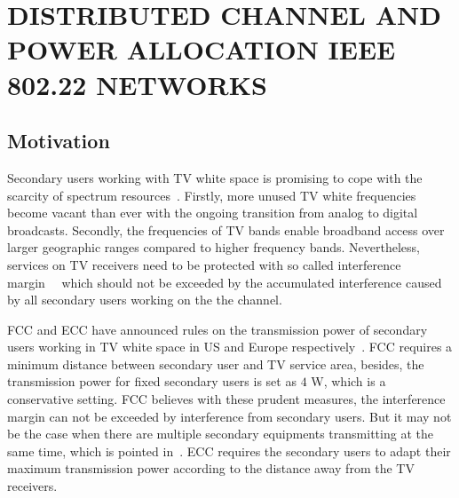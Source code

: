 \chapter{DISTRIBUTED CHANNEL AND POWER ALLOCATION IEEE 802.22 NETWORKS}

\section{Motivation}

Secondary users working with TV white space is promising to cope with the scarcity of spectrum resources~\cite{FCC_2010_sedond_memorandumm}. 
Firstly, more unused TV white frequencies become vacant than ever with the ongoing transition from analog to digital broadcasts. Secondly, the frequencies of TV bands enable broadband access over larger geographic ranges compared to higher frequency bands. Nevertheless, services on TV receivers need to be protected with so called interference margin~~\cite{multipleIntf_pimrc11} which should not be exceeded by the accumulated interference caused by all secondary users working on the the channel.

\gls{FCC} and \gls{ECC} have announced rules on the transmission power of secondary users working in TV white space in US and Europe respectively~\cite{FCC_2010_sedond_memorandumm, ecc159}. 
FCC requires a minimum distance between secondary user and TV service area, besides, the transmission power for fixed secondary users is set as $4$ \textup{W}, which is a conservative setting. %
FCC believes with these prudent measures, the interference margin can not be exceeded by interference from secondary users.
But it may not be the case when there are multiple secondary equipments transmitting at the same time, which is pointed in~\cite{Jaentti11}.
ECC requires the secondary users to adapt their maximum transmission power according to the distance away from the TV receivers.

